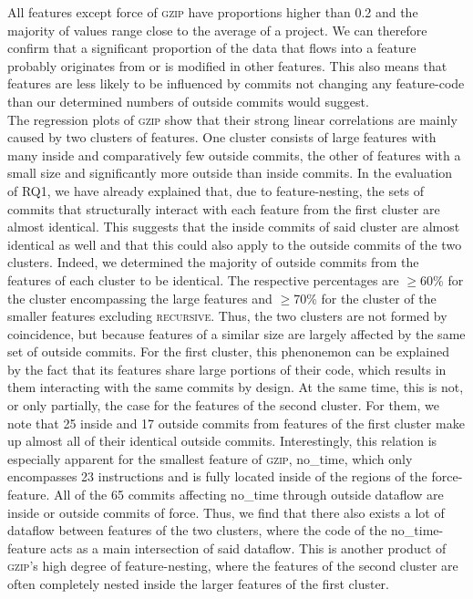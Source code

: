 All features except \textsf{force} of \textsc{gzip} have proportions higher than 0.2 and the majority of values range close to the average of a project.
We can therefore confirm that a significant proportion of the data that flows into a feature probably originates from or is modified in other features.
This also means that features are less likely to be influenced by commits not changing any feature-code than our determined numbers of outside commits would suggest. \\
The regression plots of \textsc{gzip} show that their strong linear correlations are mainly caused by two clusters of features.
One cluster consists of large features with many inside and comparatively few outside commits, the other of features with a small size and significantly more outside than inside commits.
In the evaluation of RQ1, we have already explained that, due to feature-nesting, the sets of commits that structurally interact with each feature from the first cluster are almost identical.
This suggests that the inside commits of said cluster are almost identical as well and that this could also apply to the outside commits of the two clusters.
Indeed, we determined the majority of outside commits from the features of each cluster to be identical.
The respective percentages are $\geq$60\% for the cluster encompassing the large features and $\geq$70\% for the cluster of the smaller features excluding \textsc{recursive}.
Thus, the two clusters are not formed by coincidence, but because features of a similar size are largely affected by the same set of outside commits.
For the first cluster, this phenonemon can be explained by the fact that its features share large portions of their code, which results in them interacting with the same commits by design.
At the same time, this is not, or only partially, the case for the features of the second cluster.
For them, we note that 25 inside and 17 outside commits from features of the first cluster make up almost all of their identical outside commits.
Interestingly, this relation is especially apparent for the smallest feature of \textsc{gzip}, \textsf{no\_time}, which only encompasses 23 instructions and is fully located inside of the regions of the \textsf{force}-feature.
All of the 65 commits affecting \textsf{no\_time} through outside dataflow are inside or outside commits of \textsf{force}.
Thus, we find that there also exists a lot of dataflow between features of the two clusters, where the code of the \textsf{no\_time}-feature acts as a main intersection of said dataflow.
This is another product of \textsc{gzip}'s high degree of feature-nesting, where the features of the second cluster are often completely nested inside the larger features of the first cluster.
